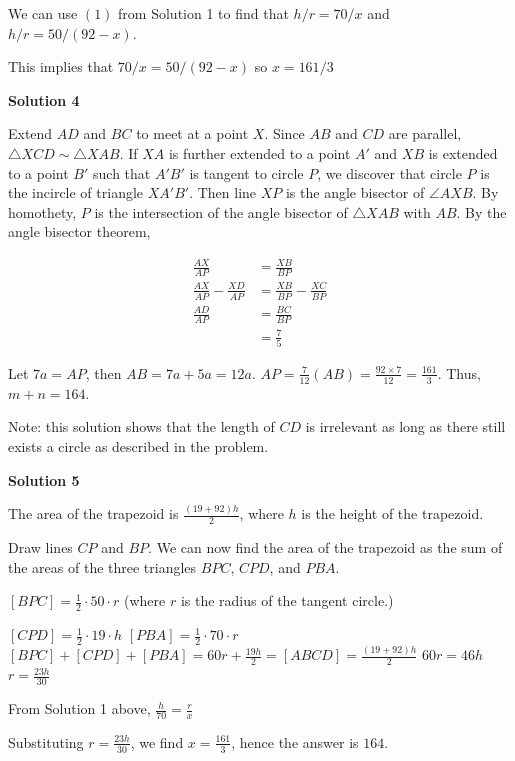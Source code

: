 \begin{enumerate}
 We can use $(1)$ from Solution 1 to find that $h/r = 70/x$  and $h/r = 50/ (92-x)$.

 This implies that  $70/x =50/(92-x)$ so $x = 161/3$




\textbf{Solution 4}

Extend $AD$ and $BC$ to meet at a point $X$. Since $AB$ and $CD$ are parallel, $\triangle XCD \sim \triangle XAB$. If $XA$ is further extended to a point $A'$ and $XB$ is extended to a point $B'$ such that $A'B'$ is tangent to circle $P$, we discover that circle $P$ is the incircle of triangle $XA'B'$. Then line $XP$ is the angle bisector of $\angle AXB$. By homothety, $P$ is the intersection of the angle bisector of $\triangle XAB$ with $AB$. By the angle bisector theorem, 

 
 \begin{align*} \frac{AX}{AP} &= \frac{XB}{BP}\\ \frac{AX}{AP} - \frac{XD}{AP} &= \frac{XB}{BP} - \frac{XC}{BP}\\ \frac{AD}{AP} &= \frac{BC}{BP}\\ &=\frac{7}{5} \end{align*}


 Let $7a = AP$, then $AB = 7a + 5a = 12a$. $AP = \frac{7}{12}(AB) = \frac{92\times 7}{12} = \frac{161}{3}$. Thus, $m + n = 164$.

 Note: this solution shows that the length of $CD$ is irrelevant as long as there still exists a circle as described in the problem.

 



\textbf{Solution 5}

The area of the trapezoid is $\frac{(19+92)h}{2}$, where $h$ is the height of the trapezoid.

 Draw lines $CP$ and $BP$. We can now find the area of the trapezoid as the sum of the areas of the three triangles $BPC$, $CPD$, and $PBA$.

 $[BPC] = \frac{1}{2} \cdot 50 \cdot r$ (where $r$ is the radius of the tangent circle.)

 $[CPD] = \frac{1}{2} \cdot 19 \cdot h$
$[PBA] = \frac{1}{2} \cdot 70 \cdot r$
$[BPC] + [CPD] + [PBA] = 60r + \frac{19h}{2} = [ABCD] = \frac{(19+92)h}{2}$
$60r = 46h$
$r = \frac{23h}{30}$

 From Solution 1 above, $\frac{h}{70} = \frac{r}{x}$

 Substituting $r = \frac{23h}{30}$, we find $x = \frac{161}{3}$, hence the answer is $\boxed{164}$.


\end{enumerate}
